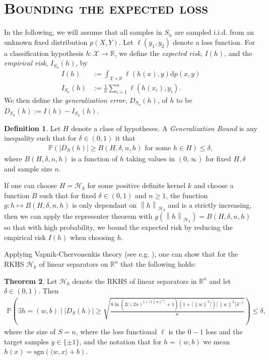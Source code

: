 \documentclass[10pt,twoside,openany,final]{memoir}
\newcommand{\sssection}[1]{%
\section[#1]{\centering\normalfont\scshape \textbf{#1}}}
\theoremstyle{definition}
\newtheorem{theorem}{Theorem}[chapter]
\newtheorem{definition}[theorem]{Definition}
\theoremstyle{Break}
\newcommand{\lv}{\left\lVert}
\newcommand{\rv}{\right\rVert}
\newcommand{\R}{\mathbb{R}}
\renewcommand{\H}{\mathcal{H}}
\renewcommand{\d}{\mathrm{d}}
\begin{document}
\sssection{Bounding the expected loss}
In the following, we will assume that all samples in $S_n$ are sampled i.i.d. from an unknown fixed distribution $p(X,Y)$. Let $\ell(y_1,y_2)$ denote a loss function. For a classification hypothesis $h \colon \mathcal{X}\to \R$, we define the \emph{expected risk}, $I(h)$, and the \emph{empirical risk}, $I_{S_n}(h)$, by
\begin{align*}
	I(h) &:= \int_{\mathcal{X}\times \R} \ell(h(x),y) \d p(x,y)\\
	I_{S_n}(h) &:= \frac{1}{n}\sum_{i = 1}^n \ell(h(x_i),y_i).
\end{align*}
We then define the \emph{generalization error}, $D_{S_n}(h)$, of $h$ to be $D_{S_n}(h):=I(h)-I_{S_n}(h)$.
\begin{definition}
	Let $H$ denote a class of hypotheses. A \emph{Generalization Bound} is any inequality such that for $\delta \in (0,1)$ it that
	\begin{align*}
		\mathbb{P}( |D_{S}(h)| \geq B(H,\delta,n,h) \text{ for some } h \in H) \leq \delta,
	\end{align*}	
	where $B(H,\delta,n,h)$ is a function of $h$ taking values in $(0,\infty)$ for fixed $H, \delta$ and sample size $n$.
\end{definition}
If one can choose $H=\H_k$ for some positive definite kernel $k$ and choose a function $B$ such that for fixed $\delta \in (0,1)$ and $n \geq 1$, the function $g \colon h \mapsto B(H,\delta,n,h)$ is only dependant on $\lv h\rv_{\H_k}$ and is a strictly increasing, then we can apply the representer theorem with $g(\lv h \rv_{\H_k})=B(H,\delta,n,h)$ so that with high probability, we bound the expected risk by reducing the empirical risk $I(h)$ when choosing $h$.

Applying Vapnik-Chervonenkis theory (see e.g. \cite{abu}), one can show that for the RKHS $\H_k$ of linear separators on $\R^n$ that the following holds:
\begin{theorem}
	Let $\H_k$ denote the RKHS of linear separators in $\R^n$ and let $\delta \in (0,1)$. Then
	\begin{align*}
		\mathbb{P}\left( \exists h=(w,b) \mid |D_{S}(h)|\geq \sqrt{\frac{8 \ln\left( 2( (2n)^{1+\lceil 1 \lv w \rv^2 \rceil }+1 \right)(1+\lceil \lv w \rv^2 \rceil)\lceil \lv w \rv^2 \rceil \delta^{-1}}{n}}\right) \leq \delta,
	\end{align*}
	where the size of $S=n$, where the loss functional $\ell$ is the $0-1$ loss and the target samples $y \in  \{\pm 1 \}$, and the notation that for $h=(w,b)$ we mean $h(x)=\mathrm{sgn}(\langle w,x \rangle+b)$.
\end{theorem}
\end{document}
